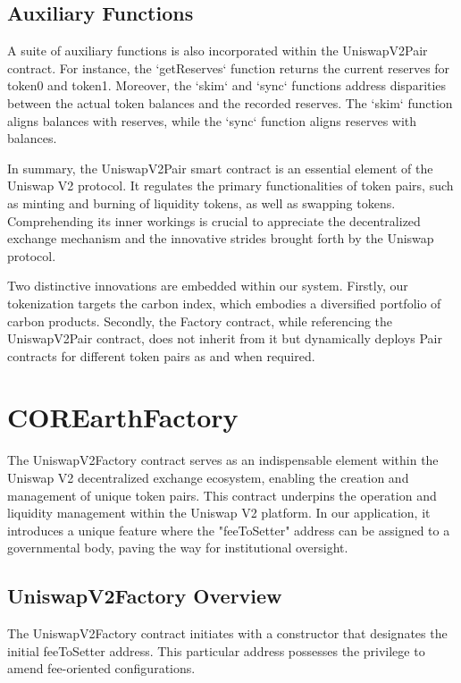 \documentclass[sigconf, authordraft]{acmart}
\begin{document}
	\subsection{Auxiliary Functions}


	A suite of auxiliary functions is also incorporated within the UniswapV2Pair contract.
	For instance, the `getReserves` function returns the current reserves for token0
	and token1. Moreover, the `skim` and `sync` functions address disparities between
	the actual token balances and the recorded reserves. The `skim` function
	aligns balances with reserves, while the `sync` function aligns reserves with balances.

	In summary, the UniswapV2Pair smart contract is an essential element of the
	Uniswap V2 protocol. It regulates the primary functionalities of token pairs,
	such as minting and burning of liquidity tokens, as well as swapping tokens.
	Comprehending its inner workings is crucial to appreciate the decentralized
	exchange mechanism and the innovative strides brought forth by the Uniswap
	protocol.

	Two distinctive innovations are embedded within our system. Firstly, our
	tokenization targets the carbon index, which embodies a diversified portfolio of
	carbon products. Secondly, the Factory contract, while referencing the
	UniswapV2Pair contract, does not inherit from it but dynamically deploys Pair contracts
	for different token pairs as and when required.
	\section{COREarthFactory}


	The UniswapV2Factory contract serves as an indispensable element within the
	Uniswap V2 decentralized exchange ecosystem, enabling the creation and management
	of unique token pairs. This contract underpins the operation and liquidity
	management within the Uniswap V2 platform. In our application, it introduces a
	unique feature where the "feeToSetter" address can be assigned to a
	governmental body, paving the way for institutional oversight.

	\subsection{UniswapV2Factory Overview}


	The UniswapV2Factory contract initiates with a constructor that designates the
	initial feeToSetter address. This particular address possesses the privilege
	to amend fee-oriented configurations.
\end{document}
